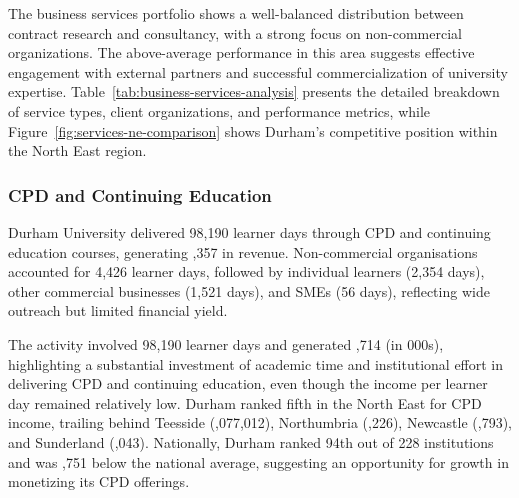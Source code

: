 \documentclass[journal,onecolumn, 10pt,draftclsnofoot]{IEEEtran}
\begin{document}
The business services portfolio shows a well-balanced distribution between contract research and consultancy, with a strong focus on non-commercial organizations. The above-average performance in this area suggests effective engagement with external partners and successful commercialization of university expertise. Table~\ref{tab:business-services-analysis} presents the detailed breakdown of service types, client organizations, and performance metrics, while Figure~\ref{fig:services-ne-comparison} shows Durham's competitive position within the North East region.

\subsubsection{CPD and Continuing Education}

Durham University delivered 98,190 learner days through CPD and continuing education courses, generating ,357 in revenue. Non-commercial organisations accounted for 4,426 learner days, followed by individual learners (2,354 days), other commercial businesses (1,521 days), and SMEs (56 days), reflecting wide outreach but limited financial yield.

The activity involved 98,190 learner days and generated ,714 (in \textsterling 000s), highlighting a substantial investment of academic time and institutional effort in delivering CPD and continuing education, even though the income per learner day remained relatively low. Durham ranked fifth in the North East for CPD income, trailing behind Teesside (,077,012), Northumbria (,226), Newcastle (,793), and Sunderland (,043). Nationally, Durham ranked 94th out of 228 institutions and was ,751 below the national average, suggesting an opportunity for growth in monetizing its CPD offerings.
\end{document}
